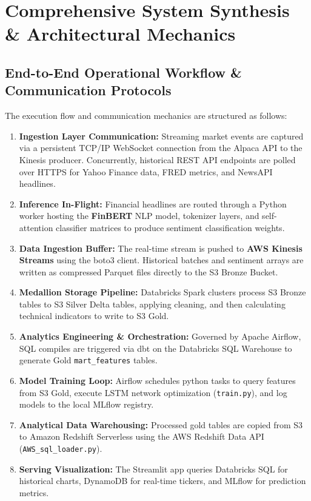 \documentclass[11pt,a4paper]{article}
\begin{document}
\section{Comprehensive System Synthesis \& Architectural Mechanics}

\subsection{End-to-End Operational Workflow \& Communication Protocols}
The execution flow and communication mechanics are structured as follows:
\begin{enumerate}
    \item \textbf{Ingestion Layer Communication:} Streaming market events are captured via a persistent TCP/IP WebSocket connection from the Alpaca API to the Kinesis producer. Concurrently, historical REST API endpoints are polled over HTTPS for Yahoo Finance data, FRED metrics, and NewsAPI headlines.
    \item \textbf{Inference In-Flight:} Financial headlines are routed through a Python worker hosting the \textbf{FinBERT} NLP model, tokenizer layers, and self-attention classifier matrices to produce sentiment classification weights.
    \item \textbf{Data Ingestion Buffer:} The real-time stream is pushed to \textbf{AWS Kinesis Streams} using the boto3 client. Historical batches and sentiment arrays are written as compressed Parquet files directly to the S3 Bronze Bucket.
    \item \textbf{Medallion Storage Pipeline:} Databricks Spark clusters process S3 Bronze tables to S3 Silver Delta tables, applying cleaning, and then calculating technical indicators to write to S3 Gold.
    \item \textbf{Analytics Engineering \& Orchestration:} Governed by Apache Airflow, SQL compiles are triggered via dbt on the Databricks SQL Warehouse to generate Gold \texttt{mart\_features} tables.
    \item \textbf{Model Training Loop:} Airflow schedules python tasks to query features from S3 Gold, execute LSTM network optimization (\texttt{train.py}), and log models to the local MLflow registry.
    \item \textbf{Analytical Data Warehousing:} Processed gold tables are copied from S3 to Amazon Redshift Serverless using the AWS Redshift Data API (\texttt{AWS\_sql\_loader.py}).
    \item \textbf{Serving Visualization:} The Streamlit app queries Databricks SQL for historical charts, DynamoDB for real-time tickers, and MLflow for prediction metrics.
\end{enumerate}
\end{document}
